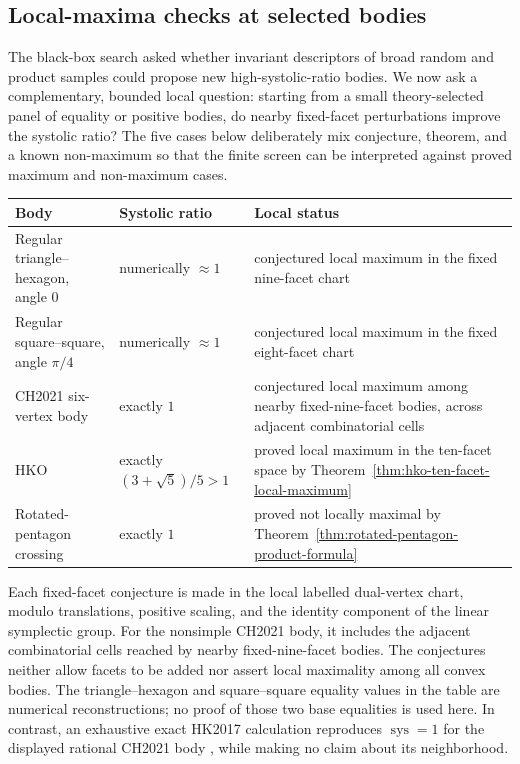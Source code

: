 \subsection{Local-maxima checks at selected bodies}
\label{subsec:black-box-datascience-local-maxima-check}

The black-box search asked whether invariant descriptors of broad random and
product samples could propose new high-systolic-ratio bodies.  We now ask a
complementary, bounded local question: starting from a small theory-selected
panel of equality or positive bodies, do nearby fixed-facet perturbations
improve the systolic ratio?  The five cases below deliberately mix conjecture,
theorem, and a known non-maximum so that the finite screen can be interpreted
against proved maximum and non-maximum cases.

\begin{center}
\small
\begin{tabular}{@{}p{.25\linewidth}p{.19\linewidth}p{.46\linewidth}@{}}
\toprule
Body & Systolic ratio & Local status \\
\midrule
Regular triangle--hexagon, angle \(0\) & numerically \(\approx1\) & conjectured local maximum in the fixed nine-facet chart \\
Regular square--square, angle \(\pi/4\) & numerically \(\approx1\) & conjectured local maximum in the fixed eight-facet chart \\
CH2021 six-vertex body \cite{CH2021} & exactly \(1\) & conjectured local maximum among nearby fixed-nine-facet bodies, across adjacent combinatorial cells \\
HKO & exactly \((3+\sqrt5)/5>1\) & proved local maximum in the ten-facet space by Theorem~\ref{thm:hko-ten-facet-local-maximum} \\
Rotated-pentagon crossing & exactly \(1\) & proved not locally maximal by Theorem~\ref{thm:rotated-pentagon-product-formula} \\
\bottomrule
\end{tabular}
\end{center}

Each fixed-facet conjecture is made in the local labelled dual-vertex chart,
modulo translations, positive scaling, and the identity component of the
linear symplectic group.  For the nonsimple CH2021 body, it includes the
adjacent combinatorial cells reached by nearby fixed-nine-facet bodies.  The
conjectures neither allow facets to be added nor assert local maximality among
all convex bodies.  The triangle--hexagon and square--square equality values
in the table are numerical reconstructions; no proof of those two base
equalities is used here.  In contrast, an exhaustive exact HK2017 calculation
reproduces \(\operatorname{sys}=1\) for the displayed rational CH2021 body
\cite{CH2021},
while making no claim about its neighborhood.

